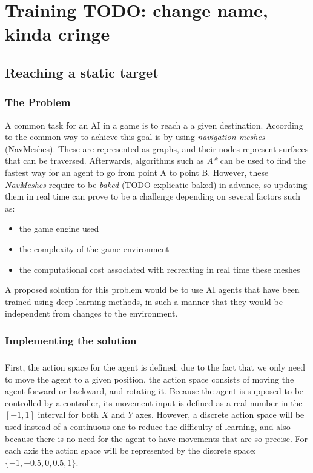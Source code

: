 \chapter{Training TODO: change name, kinda cringe}
\section{Reaching a static target}
\subsection{The Problem} \label{static_target:the_problem}
A common task for an AI in a game is to reach a a given destination. According to \cite{alonso2020deeplearningnavigation} the common way to achieve this goal is by using \emph{navigation meshes} (NavMeshes). These are represented as graphs, and their nodes represent surfaces that can be traversed. Afterwards, algorithms such as \emph{A*} can be used to find the fastest way for an agent to go from point A to point B. However, these \emph{NavMeshes} require to be \emph{baked} (TODO explicatie baked) in advance, so updating them in real time can prove to be a challenge depending on several factors such as:
\begin{itemize}
    \item the game engine used
    \item the complexity of the game environment
    \item the computational cost associated with recreating in real time these meshes
\end{itemize}

A proposed solution for this problem would be to use AI agents that have been trained using deep learning methods, in such a manner that they would be independent from changes to the environment.

\subsection{Implementing the solution} \label{static_target:implementation}
\paragraph{}
First, the action space for the agent is defined: due to the fact that we only need to move the agent to a given position, the action space consists of moving the agent forward or backward, and rotating it. Because the agent is supposed to be controlled by a controller, its movement input is defined as a real number in the $[-1, 1]$ interval for both $X$ and $Y$ axes. However, a discrete action space will be used instead of a continuous one to reduce the difficulty of learning, and also because there is no need for the agent to have movements that are so precise. For each axis the action space will be represented by the discrete space: $\{-1, -0.5, 0, 0.5, 1\}$.

